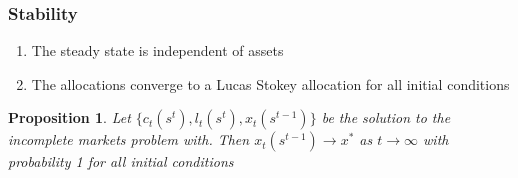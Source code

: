\documentclass{beamer}
\newcommand{\EE}{\mathbb E}
\newtheorem{proposition}{Proposition}
\begin{document}
%  
% 
% 
\begin{frame}
	\frametitle{Stability}
	\begin{enumerate}
	 \item The steady state is independent of assets
	 \item The allocations converge to a Lucas Stokey allocation for all initial conditions	 	
	\end{enumerate}

	\begin{proposition}  Let $\{c_t(s^t), l_t(s^t), x_t(s^{t-1})\}$ be the solution to the incomplete markets problem with.  Then  $x_t(s^{t-1})\rightarrow x^*$ as $t\rightarrow \infty$ with probability 1 for all initial conditions
	
	\end{proposition}  
	\end{frame}
	
\end{document}
